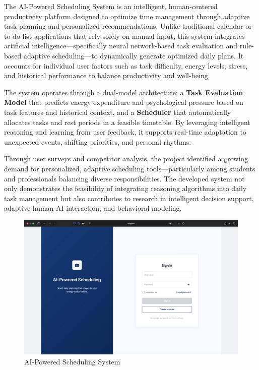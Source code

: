 \documentclass[12pt, a4paper]{article}
\begin{document}
    The AI-Powered Scheduling System is an intelligent, human-centered productivity platform designed to optimize time management through adaptive task planning and personalized recommendations. Unlike traditional calendar or to-do list applications that rely solely on manual input, this system integrates artificial intelligence—specifically neural network-based task evaluation and rule-based adaptive scheduling—to dynamically generate optimized daily plans. It accounts for individual user factors such as task difficulty, energy levels, stress, and historical performance to balance productivity and well-being. 
    
    The system operates through a dual-model architecture: a \textbf{Task Evaluation Model} that predicts energy expenditure and psychological pressure based on task features and historical context, and a \textbf{Scheduler} that automatically allocates tasks and rest periods in a feasible timetable. By leveraging intelligent reasoning and learning from user feedback, it supports real-time adaptation to unexpected events, shifting priorities, and personal rhythms.
    
    Through user surveys and competitor analysis, the project identified a growing demand for personalized, adaptive scheduling tools—particularly among students and professionals balancing diverse responsibilities. The developed system not only demonstrates the feasibility of integrating reasoning algorithms into daily task management but also contributes to research in intelligent decision support, adaptive human-AI interaction, and behavioral modeling.
    
    \begin{figure}[H]
        \centering
        \includegraphics[height=200pt]{Images/System/cover.png}
        \caption{AI-Powered Scheduling System}
        \label{system_cover}
    \end{figure}
\end{document}

